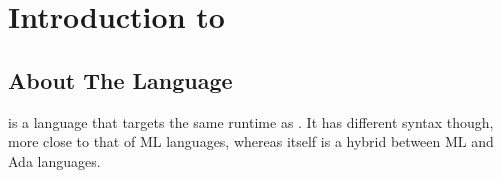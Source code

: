 
\chapter[Introduction to Amlantis\#]{Introduction to \AmlSharpTitle}

\minitoc

\newpage


\section[About The Amlantis\# Language]{About The \AmlSharpTitle Language}

\AmlSharp is a language that targets the same runtime as \Aml. It has different syntax though, more close to that of ML languages, whereas \Aml itself is a hybrid between ML and Ada languages. 






